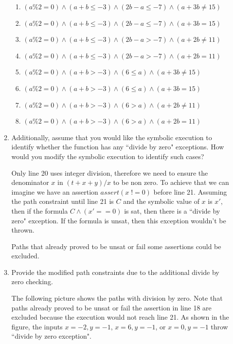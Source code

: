 \documentclass[12pt,a4paper]{article}
\begin{document}
\begin{enumerate}
\begin{enumerate}
\begin{enumerate}
\item $(a\%2 = 0) \wedge (a + b \leq -3) \wedge (2b - a \leq -7) \wedge (a + 3b \neq 15)$
\item $(a\%2 = 0) \wedge (a + b \leq -3) \wedge (2b - a \leq -7) \wedge (a + 3b = 15)$
\item $(a\%2 = 0) \wedge (a + b \leq -3) \wedge (2b - a > -7) \wedge (a + 2b \neq 11)$
\item $(a\%2 = 0) \wedge (a + b \leq -3) \wedge (2b - a > -7) \wedge (a + 2b = 11)$

\item $(a\%2 = 0) \wedge (a + b > -3) \wedge (6 \leq a) \wedge (a + 3b \neq 15)$ \label{example}
\item $(a\%2 = 0) \wedge (a + b > -3) \wedge (6 \leq a) \wedge (a + 3b = 15)$
\item $(a\%2 = 0) \wedge (a + b > -3) \wedge (6 > a) \wedge (a + 2b \neq 11)$
\item $(a\%2 = 0) \wedge (a + b > -3) \wedge (6 > a) \wedge (a + 2b = 11)$

\end{enumerate}

\color{black}

\item Additionally, assume that you would like the symbolic execution to identify whether the function has any ``divide by zero" exceptions. How would you modify the symbolic execution to identify such cases?


\color{blue}
Only line 20 uses integer division, therefore we need to ensure the denominator $x$ in $(t+x+y)/x$  to be non zero. To achieve that we can imagine we have an assertion $assert (x \; != 0) $ before line 21. Assuming the path constraint until line 21 is $C$ and the symbolic value of $x$ is $x'$, then if the formula $C \wedge (x' == 0)$ is sat, then there is a ``divide by zero" exception. If the formula is unsat, then this exception wouldn't be thrown. 


Paths that already proved to be unsat or fail some assertions could be excluded.


\color{black}

\item Provide the modified path constraints due to the additional divide by zero checking.

\color{blue}
The following picture shows the paths with division by zero. Note that paths already proved to be unsat or fail the assertion in line 18 are excluded because the execution would not reach line 21.  As shown in the figure, the inputs $x=-2, y = -1$, $x = 6, y = -1$, or $x=0, y = -1$ throw ``divide by zero exception".


\end{enumerate}
\end{enumerate}
\end{document}
